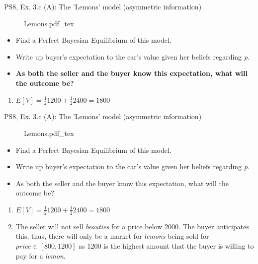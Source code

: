 \begin{frame}{PS8, Ex. 3.c (A): The 'Lemons' model (asymmetric information)}
    \begin{figure}[!h]
      \center {}
      {Lemons.pdf_tex}
    \end{figure}
    \vspace{-8pt}
    \begin{itemize}
      \item[(c)] Find a Perfect Bayesian Equilibrium of this model.
    \end{itemize}
    \vspace{-12pt}
    \begin{multicols}{2}
      \begin{itemize}
        \item[Step 1:] Write up buyer's expectation to the car's value given her beliefs regarding \textit{p}.
        \item[Step 2:] \textbf{As both the seller and the buyer know this expectation, what will the outcome be?}
      \end{itemize}
      \vfill\null\columnbreak
      \begin{enumerate}
        \item $E[V]=\frac{1}{2}1200+\frac{1}{2}2400=1800$
      \end{enumerate}
      \vfill\null
    \end{multicols}
\end{frame}
\begin{frame}{PS8, Ex. 3.c (A): The 'Lemons' model (asymmetric information)}
    \begin{figure}[!h]
      \center {}
      {Lemons.pdf_tex}
    \end{figure}
    \vspace{-8pt}
    \begin{itemize}
      \item[(c)] Find a Perfect Bayesian Equilibrium of this model.
    \end{itemize}
    \vspace{-12pt}
    \begin{multicols}{2}
      \begin{itemize}
        \item[Step 1:] Write up buyer's expectation to the car's value given her beliefs regarding \textit{p}.
        \item[Step 2:] As both the seller and the buyer know this expectation, what will the outcome be?
      \end{itemize}
      \vfill\null\columnbreak
      \begin{enumerate}
        \item $E[V]=\frac{1}{2}1200+\frac{1}{2}2400=1800$
        \item The seller will not sell \textit{beauties} for a price below 2000. The buyer anticipates this, thus, there will only be a market for \textit{lemons} being sold for $price\in[800,1200]$ as 1200 is the highest amount that the buyer is willing to pay for a \textit{lemon}.
      \end{enumerate}
      \vfill\null
    \end{multicols}
\end{frame}
